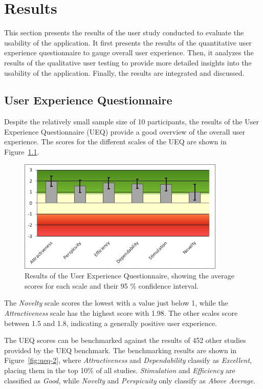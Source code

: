%
\chapter{Results}
\label{sec:result}

This section presents the results of the user study conducted to evaluate the usability of the application.
It first presents the results of the quantitative user experience questionnaire to gauge overall user experience.
Then, it analyzes the results of the qualitative user testing to provide more detailed insights into the usability of the application.
Finally, the results are integrated and discussed.

\section{User Experience Questionnaire}
\label{sec:result:ux}

Despite the relatively small sample size of 10 participants, the results of the User Experience Questionnaire (UEQ) provide a good overview of the overall user experience.
The scores for the different scales of the UEQ are shown in Figure~\ref{fig:ueq-1}. 

\begin{figure}[htb]
  \centering
	\includegraphics[width=.7\textwidth]{figures/ueq-1.png}
	\caption{Results of the User Experience Questionnaire, showing the average scores for each scale and their 95 \% confidence interval.}
  \label{fig:ueq-1}
\end{figure}

The \emph{Novelty} scale scores the lowest with a value just below 1, while the \emph{Attractiveness} scale has the highest score with 1.98.
The other scales score between 1.5 and 1.8, indicating a generally positive user experience.

The UEQ scores can be benchmarked against the results of 452 other studies provided by the UEQ benchmark.
The benchmarking results are shown in Figure~\ref{fig:ueq-2}, where \emph{Attractiveness} and \emph{Dependability} classify as \emph{Excellent}, placing them in the top 10\% of all studies.
\emph{Stimulation} and \emph{Efficiency} are classified as \emph{Good}, while \emph{Novelty} and \emph{Perspicuity} only classify as \emph{Above Average}.

